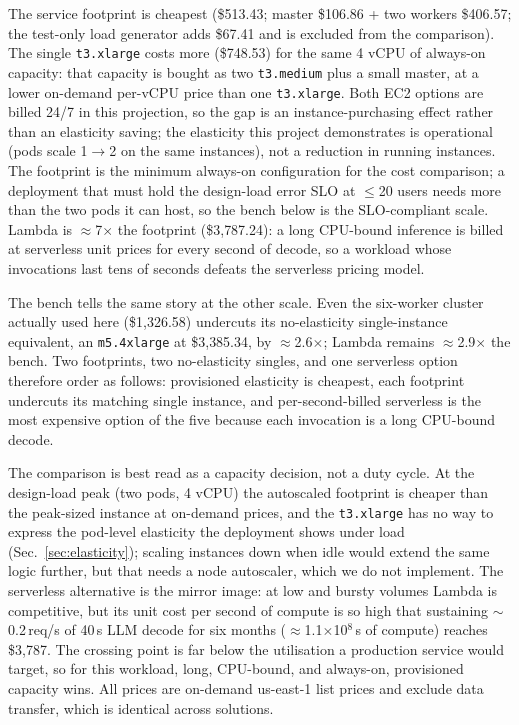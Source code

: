 \documentclass[conference]{IEEEtran}
\newcommand{\code}[1]{\texttt{#1}}
\begin{document}
The service footprint is cheapest (\$513.43; master \$106.86 + two workers
\$406.57; the test-only load generator adds \$67.41 and is excluded from the
comparison). The single \code{t3.xlarge} costs more (\$748.53) for the same
4 vCPU of always-on capacity: that capacity is bought as two \code{t3.medium}
plus a small master, at a lower on-demand per-vCPU price than one
\code{t3.xlarge}. Both EC2 options are billed 24/7 in this projection, so the
gap is an instance-purchasing effect rather than an elasticity saving; the
elasticity this project demonstrates is operational (pods scale 1$\to$2 on
the same instances), not a reduction in running instances. The footprint is
the minimum always-on configuration for the cost comparison; a deployment
that must hold the design-load error SLO at $\le$20 users needs more than the
two pods it can host, so the bench below is the SLO-compliant scale. Lambda
is $\approx$7$\times$ the footprint (\$3{,}787.24): a long CPU-bound inference is
billed at serverless unit prices for every second of decode, so a workload
whose invocations last tens of seconds defeats the serverless pricing model.

The bench tells the same story at the other scale. Even the six-worker
cluster actually used here (\$1{,}326.58) undercuts its no-elasticity
single-instance equivalent, an \code{m5.4xlarge} at \$3{,}385.34, by
$\approx$2.6$\times$; Lambda remains $\approx$2.9$\times$ the bench. Two
footprints, two no-elasticity singles, and one serverless option therefore
order as follows: provisioned elasticity is cheapest, each footprint undercuts
its matching single instance, and per-second-billed serverless is the most
expensive option of the five because each invocation is a long CPU-bound
decode.

The comparison is best read as a capacity decision, not a duty cycle. At the
design-load peak (two pods, 4 vCPU) the autoscaled footprint is cheaper than
the peak-sized instance at on-demand prices, and the \code{t3.xlarge} has no
way to express the pod-level elasticity the deployment shows under load
(Sec.~\ref{sec:elasticity}); scaling instances down when idle would extend
the same logic further, but that needs a node autoscaler, which we do not
implement. The serverless alternative is the mirror image: at low and bursty
volumes Lambda is competitive, but its unit cost per second of compute is so
high that sustaining $\sim$0.2\,req/s of 40\,s LLM decode for six months
($\approx$1.1$\times$10$^{8}$\,s of compute) reaches \$3{,}787. The crossing
point is far below the utilisation a production service would target, so for
this workload, long, CPU-bound, and always-on, provisioned capacity wins.
All prices are on-demand us-east-1 list prices and exclude data transfer,
which is identical across solutions.
\end{document}
